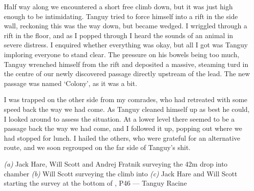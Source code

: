 Half way along we encountered a short free climb down, but it was just high enough to be intimidating. Tanguy tried to force himself into a rift in the side wall, reckoning this was the way down, but became wedged. I wriggled through a rift in the floor, and as I popped through I heard the sounds of an animal in severe distress. I enquired whether everything was okay, but all I got was Tanguy imploring everyone to stand clear. The pressure on his bowels being too much, Tanguy wrenched himself from the rift and deposited a massive, steaming turd in the centre of our newly discovered passage directly upstream of the lead. The new passage was named ‘Colony’, as it was a bit.
 
I was trapped on the other side from my comrades, who had retreated with some speed back the way we had come. As Tanguy cleaned himself up as best he could, I looked around to assess the situation. At a lower level there seemed to be a passage back the way we had come, and I followed it up, popping out where we had stopped for lunch. I hailed the others, who were grateful for an alternative route, and we soon regrouped on the far side of Tanguy’s shit.

\begin{pagefigure}
    \centering
    \begin{subfigure}[t]{0.393\textwidth}
        \centering
        \caption{} \label{Hall of the Mountain King}
    \end{subfigure}
    \hfill
    \begin{subfigure}[t]{0.59\textwidth}
        \centering
        \caption{} \label{Colony}
    \end{subfigure}

    \vspace{0.3cm}
    \begin{subfigure}[t]{\textwidth}
    \centering
        \caption{} \label{Bottom of Blue Danube}
    \end{subfigure}
    
    \caption{
    \textit{(a)} Jack Hare, Will Scott and Andrej Fratnik surveying the 42m drop into \protect{} chamber
    \textit{(b)} Will Scott surveying the climb into \protect{}
    \textit{(c)} Jack Hare and Will Scott starting the survey at the bottom of \protect{}, P46 --- Tanguy Racine }

\end{pagefigure}


